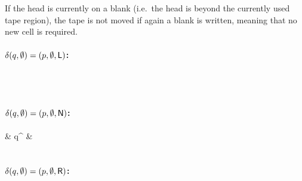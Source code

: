 \documentclass[a4paper,UKenglish,cleveref, autoref]{lipics-v2019}
\begin{document}
If the head is currently on a blank (i.e.\ the head is beyond the currently used tape region), the tape is not moved if again a blank is written, meaning that no new cell is required.
\paragraph*{$\delta(q, \emptyset) = (p, \emptyset, \textsf{L})$:}
\begin{center}
   \\[3ex]
   \\[3ex]
\end{center}

\paragraph*{$\delta(q, \emptyset) = (p, \emptyset, \textsf{N})$:}
\begin{center}
   {\blank & q^{\blank} & } \\[3ex]
   \\[3ex]
\end{center}

\paragraph*{$\delta(q, \emptyset) = (p, \emptyset, \textsf{R})$:}
\begin{center}
   \\[3ex]
   \\[3ex]
\end{center}
\end{document}
